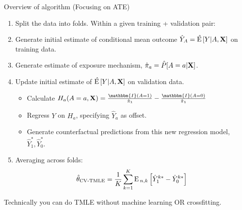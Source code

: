 \documentclass[xcolor={table}, handout]{beamer}
\begin{document}
\note{
\scriptsize \singlespacing

}
\begin{frame}{Overview of algorithm (Focusing on ATE)}

\begin{enumerate}
\item Split the data into folds. \pause Within a given training + validation pair:\pause
\item Generate initial estimate of conditional mean outcome $\hat Y_A = \hat {{\textrm E}\,} [Y | A, \mathbf{X} ]$ on training data. \pause 
\item Generate estimate of exposure mechanism, $\hat\pi_a = \hat P[A = a | \mathbf{X}]$. \pause
\item Update initial estimate of $\hat {{\textrm E}\,} [Y | A, \mathbf{X} ]$ on validation data.\pause
\begin{itemize}
\item Calculate $H_a(A = a, \X) = \frac{\mathbbm{I}(A = 1)}{\hat \pi_1} - \frac{\mathbbm{I}(A = 0)}{\hat \pi_1}$\pause
\item Regress $Y$ on $H_a$, specifying $\hat Y_a$ as offset. \pause
\item Generate counterfactual predictions from this new regression model, $\hat Y_1^*, \hat Y_0^*$. \pause
\end{itemize}
\item 
Averaging across folds:
\[
\hat{\theta}_{\textrm{CV-TMLE}} = \frac 1 K \sum_{k = 1}^K {\textrm E}\,_{n, k}\left[\hat Y_1^{k*} - \hat Y_0^{k*} \right]
\]
\end{enumerate}\pause

Technically you can do TMLE without machine learning OR crossfitting. 

\end{frame}
\end{document}

